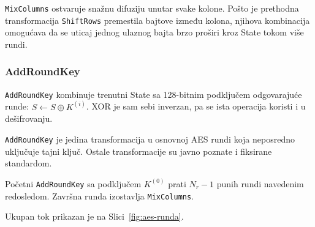\texttt{MixColumns} ostvaruje snažnu difuziju unutar svake kolone.
Pošto je prethodna transformacija \texttt{ShiftRows} premestila
bajtove između kolona, njihova kombinacija omogućava da se uticaj
jednog ulaznog bajta brzo proširi kroz State tokom više rundi.


\subsubsection{AddRoundKey}

\texttt{AddRoundKey} kombinuje trenutni State sa 128-bitnim podključem
odgovarajuće runde:
$S \leftarrow S \oplus K^{(i)}$.
XOR je sam sebi inverzan, pa se ista operacija koristi i u dešifrovanju.

\texttt{AddRoundKey} je jedina transformacija u osnovnoj AES rundi koja
neposredno uključuje tajni ključ. Ostale transformacije su javno
poznate i fiksirane standardom.

Početni \texttt{AddRoundKey} sa podključem $K^{(0)}$ prati $N_r-1$
punih rundi navedenim redosledom. Završna runda izostavlja
\texttt{MixColumns}.

Ukupan tok prikazan je na Slici~\ref{fig:aes-runda}.

